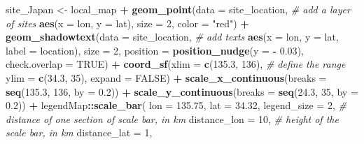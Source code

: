 \documentclass[
  xelatex,ja=standard]{bxjsarticle}
\newenvironment{Shaded}{\begin{snugshade}}{\end{snugshade}}
\newcommand{\CommentTok}[1]{\textcolor[rgb]{0.56,0.35,0.01}{\textit{#1}}}
\newcommand{\DataTypeTok}[1]{\textcolor[rgb]{0.13,0.29,0.53}{#1}}
\newcommand{\DecValTok}[1]{\textcolor[rgb]{0.00,0.00,0.81}{#1}}
\newcommand{\FloatTok}[1]{\textcolor[rgb]{0.00,0.00,0.81}{#1}}
\newcommand{\KeywordTok}[1]{\textcolor[rgb]{0.13,0.29,0.53}{\textbf{#1}}}
\newcommand{\NormalTok}[1]{#1}
\newcommand{\OperatorTok}[1]{\textcolor[rgb]{0.81,0.36,0.00}{\textbf{#1}}}
\newcommand{\OtherTok}[1]{\textcolor[rgb]{0.56,0.35,0.01}{#1}}
\newcommand{\StringTok}[1]{\textcolor[rgb]{0.31,0.60,0.02}{#1}}
\begin{document}
\begin{Shaded}
\begin{Highlighting}[]
\NormalTok{site_Japan <-}\StringTok{ }
\StringTok{  }\NormalTok{local_map }\OperatorTok{+}
\StringTok{  }\KeywordTok{geom_point}\NormalTok{(}\DataTypeTok{data =}\NormalTok{ site_location, }\CommentTok{# add a layer of sites}
             \KeywordTok{aes}\NormalTok{(}\DataTypeTok{x =}\NormalTok{ lon,}
                 \DataTypeTok{y =}\NormalTok{ lat),}
             \DataTypeTok{size =} \DecValTok{2}\NormalTok{,}
             \DataTypeTok{color =} \StringTok{"red"}\NormalTok{) }\OperatorTok{+}
\StringTok{  }\KeywordTok{geom_shadowtext}\NormalTok{(}\DataTypeTok{data =}\NormalTok{ site_location, }\CommentTok{# add texts }
                  \KeywordTok{aes}\NormalTok{(}\DataTypeTok{x =}\NormalTok{ lon,}
                      \DataTypeTok{y =}\NormalTok{ lat,}
                      \DataTypeTok{label =}\NormalTok{ location),}
                  \DataTypeTok{size =} \DecValTok{2}\NormalTok{,}
                  \DataTypeTok{position =} \KeywordTok{position_nudge}\NormalTok{(}\DataTypeTok{y =} \OperatorTok{-}\StringTok{ }\FloatTok{0.03}\NormalTok{),}
                  \DataTypeTok{check.overlap =} \OtherTok{TRUE}\NormalTok{) }\OperatorTok{+}
\StringTok{  }\KeywordTok{coord_sf}\NormalTok{(}\DataTypeTok{xlim =} \KeywordTok{c}\NormalTok{(}\FloatTok{135.3}\NormalTok{, }\DecValTok{136}\NormalTok{), }\CommentTok{# define the range}
           \DataTypeTok{ylim =} \KeywordTok{c}\NormalTok{(}\FloatTok{34.3}\NormalTok{, }\DecValTok{35}\NormalTok{),}
           \DataTypeTok{expand =} \OtherTok{FALSE}\NormalTok{) }\OperatorTok{+}
\StringTok{  }\KeywordTok{scale_x_continuous}\NormalTok{(}\DataTypeTok{breaks =} \KeywordTok{seq}\NormalTok{(}\FloatTok{135.3}\NormalTok{, }\DecValTok{136}\NormalTok{, }\DataTypeTok{by =} \FloatTok{0.2}\NormalTok{)) }\OperatorTok{+}\StringTok{ }
\StringTok{  }\KeywordTok{scale_y_continuous}\NormalTok{(}\DataTypeTok{breaks =} \KeywordTok{seq}\NormalTok{(}\FloatTok{24.3}\NormalTok{, }\DecValTok{35}\NormalTok{, }\DataTypeTok{by =} \FloatTok{0.2}\NormalTok{)) }\OperatorTok{+}
\StringTok{  }\NormalTok{legendMap}\OperatorTok{::}\KeywordTok{scale_bar}\NormalTok{( }
    \DataTypeTok{lon =} \FloatTok{135.75}\NormalTok{,}
    \DataTypeTok{lat =} \FloatTok{34.32}\NormalTok{,}
    \DataTypeTok{legend_size =} \DecValTok{2}\NormalTok{,}
    \CommentTok{# distance of one section of scale bar, in km}
    \DataTypeTok{distance_lon =} \DecValTok{10}\NormalTok{,}
    \CommentTok{# height of the scale bar, in km}
    \DataTypeTok{distance_lat =} \DecValTok{1}\NormalTok{,}

\end{Highlighting}
\end{Shaded}
\end{document}
